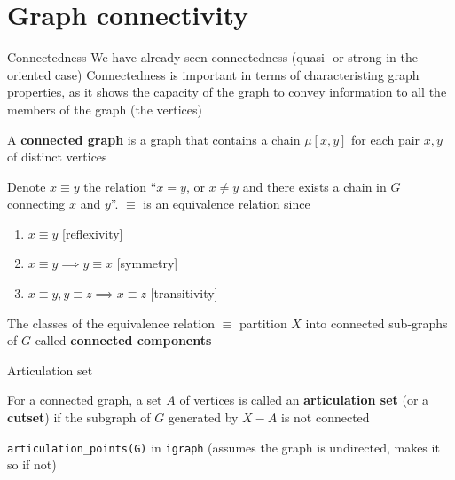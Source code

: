 \documentclass[aspectratio=43]{beamer}
\begin{document}
\section{Graph connectivity}

\begin{frame}{Connectedness}
We have already seen connectedness (quasi- or strong in the oriented case)
\vfill
Connectedness is important in terms of characteristing graph properties, as it shows the capacity of the graph to convey information to all the members of the graph (the vertices)
\end{frame}


\begin{frame}
	\begin{definition}
	A \textbf{connected graph} is a graph that contains a chain $\mu[x,y]$ for each pair $x,y$ of distinct vertices
	\end{definition}
	\vfill
	Denote $x\equiv y$ the relation  ``$x=y$, or $x\neq y$ and there exists a chain in $G$ connecting $x$ and $y$''. $\equiv$ is an equivalence relation since
	\begin{enumerate}
		\item $x\equiv y$ \hfill[reflexivity]
		\item $x\equiv y\implies y\equiv x$ \hfill[symmetry]
		\item $x\equiv y, y\equiv z\implies x\equiv z$ \hfill[transitivity]
	\end{enumerate}
	\begin{definition}
	The classes of the equivalence relation $\equiv$ partition $X$ into connected sub-graphs of $G$ called \textbf{connected components}
	\end{definition}
	\end{frame}
	
\begin{frame}{Articulation set} 
	\begin{definition}
	For a connected graph, a set $A$ of vertices is called an \textbf{articulation set} (or a \textbf{cutset}) if the subgraph of $G$ generated by $X-A$ is not connected
	\end{definition}
	\vfill
	{\tt articulation\_points(G)} in {\tt igraph} (assumes the graph is undirected, makes it so if not)
\end{frame}
\end{document}
